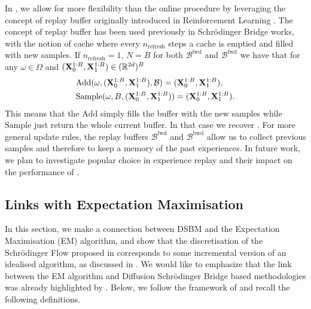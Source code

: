 \documentclass{article}
\begin{document}
In , we allow for more flexibility than the online procedure by leveraging the concept of replay buffer originally introduced in Reinforcement Learning \cite{mnih2015human}.
The concept of replay buffer has been used previously in Schr\"odinger Bridge works, with the notion of cache where every $n_{\mathrm{refresh}}$ steps a cache is emptied and filled with new samples.
If $n_{\mathrm{refresh}} = 1$, $N=B$ for both $\mathcal{B}^{\mathrm{fwd}}$ and $\mathcal{B}^{\mathrm{fwd}}$ we have that for any $\omega \in \Omega$ and $(\mathbf{X}_0^{1:B}, \mathbf{X}_1^{1:B}) \in (\mathbb{R}^{2d})^{B}$ 
\begin{align}
    &\mathrm{Add}(\omega, (\mathbf{X}_0^{1:B}, \mathbf{X}_1^{1:B}), \mathcal{B}) = (\mathbf{X}_0^{1:B}, \mathbf{X}_1^{1:B}) , \\ &\mathrm{Sample}(\omega, B, (\mathbf{X}_0^{1:B}, \mathbf{X}_1^{1:B})) = (\mathbf{X}_0^{1:B}, \mathbf{X}_1^{1:B}) .
\end{align}
This means that the $\mathrm{Add}$ simply fills the buffer with the new samples while $\mathrm{Sample}$ just return the whole current buffer. In that case we recover . For more general update rules, the replay buffers $\mathcal{B}^{\mathrm{fwd}}$ and $\mathcal{B}^{\mathrm{bwd}}$ allow us to collect previous samples and therefore to keep a memory of the past experiences. In future work, we plan to investigate popular choice in experience replay and their impact on the performance of .



\subsection{Links with Expectation Maximisation}
\label{sec:link_with_em}
In this section, we make a connection between DSBM and the Expectation Maximisation (EM) algorithm, and show that the discretisation of the Schr\"odinger Flow proposed in  corresponds to some incremental version of an idealised algorithm, as discussed in \cite{neal1998view}. We would like to emphasize that the link between the EM algorithm and Diffusion Schr\"odinger Bridge based methodologies was already highlighted by \cite{vargas2023transport,brekelmans2023schrodinger}. Below, we follow the framework of \cite{brekelmans2023schrodinger} and recall the following definitions.
\end{document}
